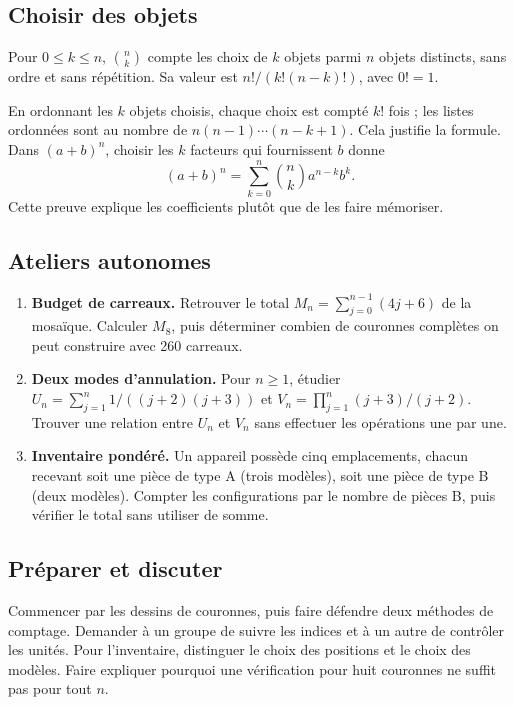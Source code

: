 \subsection{Choisir des objets}
\begin{definition}
Pour $0\leq k\leq n$, $\binom nk$ compte les choix de $k$ objets parmi $n$ objets distincts, sans ordre et sans répétition. Sa valeur est $n!/(k!(n-k)!)$, avec $0!=1$.
\end{definition}
En ordonnant les $k$ objets choisis, chaque choix est compté $k!$ fois ; les listes ordonnées sont au nombre de $n(n-1)\cdots(n-k+1)$. Cela justifie la formule. Dans $(a+b)^n$, choisir les $k$ facteurs qui fournissent $b$ donne
\[ (a+b)^n=\sum_{k=0}^n\binom nk a^{n-k}b^k. \]
Cette preuve explique les coefficients plutôt que de les faire mémoriser.
\subsection{Ateliers autonomes}
\begin{enumerate}
\item \textbf{Budget de carreaux.} Retrouver le total $M_n=\sum_{j=0}^{n-1}(4j+6)$ de la mosaïque. Calculer $M_8$, puis déterminer combien de couronnes complètes on peut construire avec 260 carreaux.
\item \textbf{Deux modes d'annulation.} Pour $n\geq1$, étudier $U_n=\sum_{j=1}^n1/((j+2)(j+3))$ et $V_n=\prod_{j=1}^n(j+3)/(j+2)$. Trouver une relation entre $U_n$ et $V_n$ sans effectuer les opérations une par une.
\item \textbf{Inventaire pondéré.} Un appareil possède cinq emplacements, chacun recevant soit une pièce de type A (trois modèles), soit une pièce de type B (deux modèles). Compter les configurations par le nombre de pièces B, puis vérifier le total sans utiliser de somme.
\end{enumerate}
\ifprof
\subsection{Préparer et discuter}
Commencer par les dessins de couronnes, puis faire défendre deux méthodes de comptage. Demander à un groupe de suivre les indices et à un autre de contrôler les unités. Pour l'inventaire, distinguer le choix des positions et le choix des modèles. Faire expliquer pourquoi une vérification pour huit couronnes ne suffit pas pour tout $n$.

\fi
